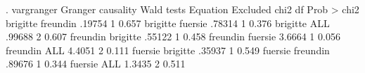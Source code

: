 {\smallskip}
. vargranger
{\smallskip}
   Granger causality Wald tests
  {\TLC}
  {\VBAR}          Equation           Excluded {\VBAR}   chi2     df Prob > chi2 {\VBAR}
  {\LFTT}
  {\VBAR}          brigitte           freundin {\VBAR}  .19754     1    0.657    {\VBAR}
  {\VBAR}          brigitte            fuersie {\VBAR}  .78314     1    0.376    {\VBAR}
  {\VBAR}          brigitte                ALL {\VBAR}  .99688     2    0.607    {\VBAR}
  {\LFTT}
  {\VBAR}          freundin           brigitte {\VBAR}  .55122     1    0.458    {\VBAR}
  {\VBAR}          freundin            fuersie {\VBAR}  3.6664     1    0.056    {\VBAR}
  {\VBAR}          freundin                ALL {\VBAR}  4.4051     2    0.111    {\VBAR}
  {\LFTT}
  {\VBAR}           fuersie           brigitte {\VBAR}  .35937     1    0.549    {\VBAR}
  {\VBAR}           fuersie           freundin {\VBAR}  .89676     1    0.344    {\VBAR}
  {\VBAR}           fuersie                ALL {\VBAR}  1.3435     2    0.511    {\VBAR}
  {\BLC}
